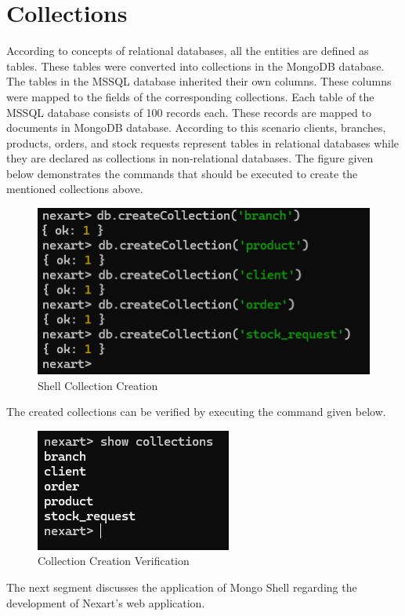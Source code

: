 \documentclass[a4Paper,12pt]{report}
\begin{document}
\section{Collections}
According to concepts of relational databases, all the entities are defined as tables. These tables were converted into collections in the MongoDB database. The tables in the MSSQL database inherited their own columns. These columns were mapped to the fields of the corresponding collections. Each table of the MSSQL database consists of 100 records each. These records are mapped to documents in MongoDB database. According to this scenario clients, branches, products, orders, and stock requests represent tables in relational databases while they are declared as collections in non-relational databases. The figure given below demonstrates the commands that should be executed to create the mentioned collections above. 
\begin{figure}[H]
\centering
\includegraphics[scale=0.8]{images/collection_creation_shell.png}
\caption{Shell Collection Creation}
\end{figure}
The created collections can be verified by executing the command given below.
\begin{figure}[H]
\centering
\includegraphics[scale=0.8]{images/collection_creation_shell_confirmation.png}
\caption{Collection Creation Verification}
\end{figure}
The next segment discusses the application of Mongo Shell regarding the development of Nexart’s web application. 
\end{document}
